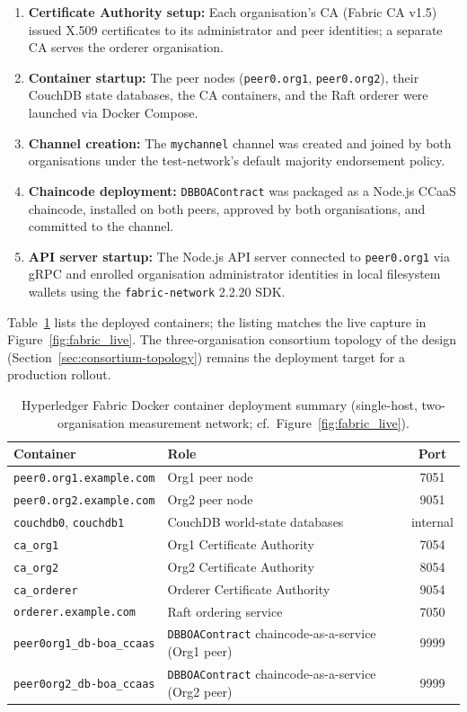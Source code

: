\begin{enumerate}
    \item \textbf{Certificate Authority setup:} Each organisation's CA (Fabric CA v1.5) issued X.509 certificates to its administrator and peer identities; a separate CA serves the orderer organisation.
    \item \textbf{Container startup:} The peer nodes (\texttt{peer0.org1}, \texttt{peer0.org2}), their CouchDB state databases, the CA containers, and the Raft orderer were launched via Docker Compose.
    \item \textbf{Channel creation:} The \texttt{mychannel} channel was created and joined by both organisations under the test-network's default majority endorsement policy.
    \item \textbf{Chaincode deployment:} \texttt{DBBOAContract} was packaged as a Node.js CCaaS chaincode, installed on both peers, approved by both organisations, and committed to the channel.
    \item \textbf{API server startup:} The Node.js API server connected to \texttt{peer0.org1} via gRPC and enrolled organisation administrator identities in local filesystem wallets using the \texttt{fabric-network} 2.2.20 SDK.
\end{enumerate}

Table~\ref{tab:docker_deployment} lists the deployed containers; the listing matches the live capture in Figure~\ref{fig:fabric_live}. The three-organisation consortium topology of the design (Section~\ref{sec:consortium-topology}) remains the deployment target for a production rollout.

\begin{table}[H]
\centering
\caption{Hyperledger Fabric Docker container deployment summary (single-host, two-organisation measurement network; cf.\ Figure~\ref{fig:fabric_live}).}
\label{tab:docker_deployment}
\begin{tabular}{|l|p{5.6cm}|c|}
\hline
\textbf{Container} & \textbf{Role} & \textbf{Port} \\ \hline
\texttt{peer0.org1.example.com} & Org1 peer node & 7051 \\ \hline
\texttt{peer0.org2.example.com} & Org2 peer node & 9051 \\ \hline
\texttt{couchdb0}, \texttt{couchdb1} & CouchDB world-state databases & internal \\ \hline
\texttt{ca\_org1} & Org1 Certificate Authority & 7054 \\ \hline
\texttt{ca\_org2} & Org2 Certificate Authority & 8054 \\ \hline
\texttt{ca\_orderer} & Orderer Certificate Authority & 9054 \\ \hline
\texttt{orderer.example.com} & Raft ordering service & 7050 \\ \hline
\texttt{peer0org1\_db-boa\_ccaas} & \texttt{DBBOAContract} chaincode-as-a-service (Org1 peer) & 9999 \\ \hline
\texttt{peer0org2\_db-boa\_ccaas} & \texttt{DBBOAContract} chaincode-as-a-service (Org2 peer) & 9999 \\ \hline
\end{tabular}
\end{table}

